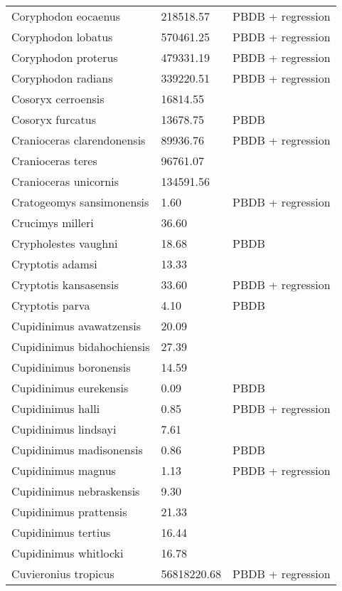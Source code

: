 \documentclass{article}
\begin{document}
\begin{center}
\begin{longtable}{p{} p{} p{}}
    Coryphodon eocaenus & 218518.57 & PBDB + regression \\ 
    Coryphodon lobatus & 570461.25 & PBDB + regression \\ 
    Coryphodon proterus & 479331.19 & PBDB + regression \\ 
    Coryphodon radians & 339220.51 & PBDB + regression \\ 
    Cosoryx cerroensis & 16814.55 & \cite{Tomiya2013} \\ 
    Cosoryx furcatus & 13678.75 & PBDB \\ 
    Cranioceras clarendonensis & 89936.76 & PBDB + regression \\ 
    Cranioceras teres & 96761.07 & \cite{Tomiya2013} \\ 
    Cranioceras unicornis & 134591.56 & \cite{Tomiya2013} \\ 
    Cratogeomys sansimonensis & 1.60 & PBDB + regression \\ 
    Crucimys milleri & 36.60 & \cite{Tomiya2013} \\ 
    Crypholestes vaughni & 18.68 & PBDB \\ 
    Cryptotis adamsi & 13.33 & \cite{Tomiya2013} \\ 
    Cryptotis kansasensis & 33.60 & PBDB + regression \\ 
    Cryptotis parva & 4.10 & PBDB \\ 
    Cupidinimus avawatzensis & 20.09 & \cite{Tomiya2013} \\ 
    Cupidinimus bidahochiensis & 27.39 & \cite{Tomiya2013} \\ 
    Cupidinimus boronensis & 14.59 & \cite{Tomiya2013} \\ 
    Cupidinimus eurekensis & 0.09 & PBDB \\ 
    Cupidinimus halli & 0.85 & PBDB + regression \\ 
    Cupidinimus lindsayi & 7.61 & \cite{Tomiya2013} \\ 
    Cupidinimus madisonensis & 0.86 & PBDB \\ 
    Cupidinimus magnus & 1.13 & PBDB + regression \\ 
    Cupidinimus nebraskensis & 9.30 & \cite{Tomiya2013} \\ 
    Cupidinimus prattensis & 21.33 & \cite{Tomiya2013} \\ 
    Cupidinimus tertius & 16.44 & \cite{Tomiya2013} \\ 
    Cupidinimus whitlocki & 16.78 & \cite{Tomiya2013} \\ 
    Cuvieronius tropicus & 56818220.68 & PBDB + regression \\ 

\end{longtable}
\end{center}
\end{document}
